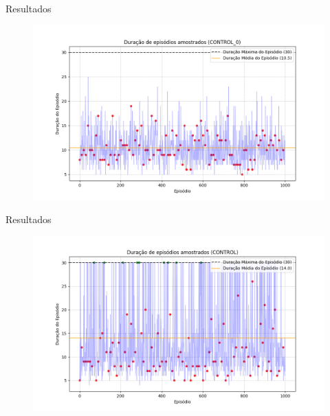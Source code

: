 \documentclass[aspectratio=169]{beamer}
\begin{document}
\begin{frame}{Resultados}
                \begin{figure}[htpb]
                    \centering
                    \includegraphics[width=0.85\linewidth]{figures/episode_lengths_control_0.png}
                    \label{fig:ep_lens_control_0}
                \end{figure}
\end{frame}
\begin{frame}{Resultados}
                \begin{figure}[htpb]
                    \centering
                    \includegraphics[width=0.85\linewidth]{figures/episode_lengths_control.png}
                    \label{fig:ep_lens_control}
                \end{figure}
\end{frame}
\end{document}
